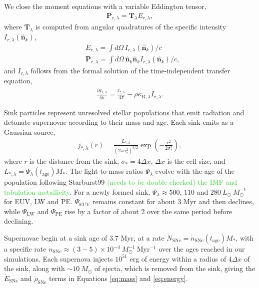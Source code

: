 \documentclass[twocolumn,linenumbers]{aastex631}
\begin{document}
We close the moment equations with a variable Eddington tensor,
\begin{align}
\mathbf{P}_{r,\lambda} = \mathbf{T}_\lambda E_{r,\lambda},
\end{align}
where $\mathbf{T}_\lambda$ is computed from angular quadratures of the specific intensity $I_{r,\lambda}(\mathbf{\hat{n}}_k)$,
\begin{align}
&E_{r,\lambda} = \int d\Omega\, I_{r,\lambda}(\mathbf{\hat{n}}_k) / c \\
&\mathbf{P}_{r,\lambda} = \int d\Omega\, \mathbf{\hat{n}}_k \mathbf{\hat{n}}_k I_{r,\lambda}(\mathbf{\hat{n}}_k) / c,
\end{align}
and $I_{r,\lambda}$ follows from the formal solution of the time-independent transfer equation,
\begin{align}
\frac{\partial I_{r,\lambda}}{\partial s} = \frac{j_{*,\lambda}}{4\pi} - \rho \kappa_{\mathrm{R},\lambda} I_{r,\lambda}.
\end{align}

Sink particles represent unresolved stellar populations that emit radiation and detonate supernovae according to their mass and age. Each sink emits as a Gaussian source,
\begin{align}
j_{*,\lambda}(r) = \frac{L_{*,\lambda}}{(2\pi\sigma_*^2)^{3/2}} \exp\left(-\frac{r^2}{2\sigma_*^2}\right),
\end{align}
where $r$ is the distance from the sink, $\sigma_* = 4\Delta x$, $\Delta x$ is the cell size, and $L_{*,\lambda} = \Psi_\lambda(t_\mathrm{age}) M_*$. The light-to-mass ratios $\Psi_\lambda$ evolve with the age of the population following Starburst99 \citep{1999ApJS..123....3L} \textcolor{limegreen}{(needs to be double-checked) the IMF and tabulation metallicity}. For a newly formed sink, $\Psi_\lambda \approx 500$, $110$ and $280\ L_\odot\ M_\odot^{-1}$ for EUV, LW and PE. $\Psi_\mathrm{EUV}$ remains constant for about 3 Myr and then declines, while $\Psi_\mathrm{LW}$ and $\Psi_\mathrm{PE}$ rise by a factor of about 2 over the same period before declining.

Supernovae begin at a sink age of $3.7$ Myr, at a rate $\dot{N}_\mathrm{SNe} = \dot{n}_\mathrm{SNe}(t_\mathrm{age}) M_*$, with a specific rate $\dot{n}_\mathrm{SNe} \approx (3-5)\times10^{-4}\ M_\odot^{-1}\ \mathrm{Myr^{-1}}$ over the ages reached in our simulations. Each supernova injects $10^{51}$ erg of energy within a radius of $4\Delta x$ of the sink, along with $\sim 10\ M_\odot$ of ejecta, which is removed from the sink, giving the $\dot{E}_\mathrm{SNe}$ and $\dot{\rho}_\mathrm{SNe}$ terms in Equations \ref{eq:mass} and \ref{eq:energy}.
\end{document}
